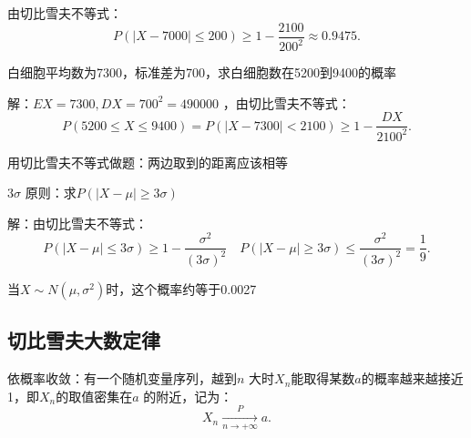 由切比雪夫不等式：\[
    P\left( \left| X-7000 \right|\le 200 \right)\ge 1-\frac{2100}{200^2 }\approx 0.9475
.\]
\begin{eg}
    白细胞平均数为7300，标准差为700，求白细胞数在5200到9400的概率
\end{eg}
解：$EX=7300,DX=700^2 =490000$ ，由切比雪夫不等式：\[
    P\left( 5200\le X\le 9400 \right)=P\left( \left| X-7300 \right|<2100 \right)\ge 1-\frac{DX}{2100^2 }
.\]
\begin{notation}
    用切比雪夫不等式做题：两边取到的距离应该相等
\end{notation}
\begin{eg}
    $3\sigma$ 原则：求$P\left( \left| X-\mu \right|\ge 3\sigma \right)$
\end{eg}
解：由切比雪夫不等式：\[
    P\left( \left| X-\mu \right|\le 3\sigma \right)\ge 1-\frac{\sigma^2 }{(3\sigma)^2 } \quad P\left( \left| X-\mu \right|\ge 3\sigma \right)\le \frac{\sigma^2 }{\left( 3\sigma \right)^2 }=\frac{1}{9}
.\]
\begin{notation}
    当$X\sim N\left( \mu,\sigma^2  \right)$时，这个概率约等于0.0027
\end{notation}
\subsection{切比雪夫大数定律}%
\label{sub:切比雪夫大数定律}
\begin{defi}
    依概率收敛：有一个随机变量序列，越到$n$ 大时$X_{n}$能取得某数$a$的概率越来越接近1，即$X_{n}$的取值密集在$a$ 的附近，记为：\[
        X_{n}\xrightarrow[n\to +\infty ]{P}a
    .\]
\end{defi}

